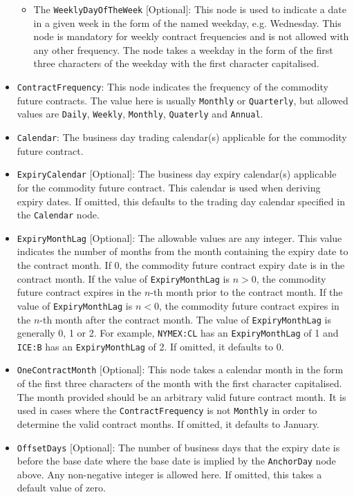 \begin{itemize}
\begin{itemize}
    \item The \lstinline!WeeklyDayOfTheWeek! [Optional]: This node is used to indicate a date in a given week in the form of the named weekday, e.g. Wednesday. This node is mandatory for weekly contract frequencies and is not allowed with any other frequency.  The node takes a weekday in the form of the first three characters of the weekday with the first character capitalised.
    \end{itemize}
\item \lstinline!ContractFrequency!: This node indicates the frequency of the commodity future contracts. The value here is usually \lstinline!Monthly! or \lstinline!Quarterly!, but allowed values are \lstinline!Daily!, \lstinline!Weekly!, \lstinline!Monthly!, \lstinline!Quaterly! and \lstinline!Annual!.
\item \lstinline!Calendar!: The business day trading calendar(s) applicable for the commodity future contract.
\item \lstinline!ExpiryCalendar! [Optional]: The business day expiry calendar(s) applicable for the commodity future contract. This calendar is used when deriving expiry dates. If omitted, this defaults to the trading day calendar specified in the \lstinline!Calendar! node.
\item \lstinline!ExpiryMonthLag! [Optional]: The allowable values are any integer. This value indicates the number of months from the month containing the expiry date to the contract month. If 0, the commodity future contract expiry date is in the contract month. If the value of \lstinline!ExpiryMonthLag! is $n > 0$, the commodity future contract expires in the $n$-th month prior to the contract month. If the value of \lstinline!ExpiryMonthLag! is $n < 0$, the commodity future contract expires in the $n$-th month after the contract month. The value of \lstinline!ExpiryMonthLag! is generally 0, 1 or 2. For example, \lstinline!NYMEX:CL! has an \lstinline!ExpiryMonthLag! of 1 and \lstinline!ICE:B! has an \lstinline!ExpiryMonthLag! of 2. If omitted, it defaults to 0.
\item \lstinline!OneContractMonth! [Optional]: This node takes a calendar month in the form of the first three characters of the month with the first character capitalised. The month provided should be an arbitrary valid future contract month. It is used in cases where the \lstinline!ContractFrequency! is not \lstinline!Monthly! in order to determine the valid contract months. If omitted, it defaults to January.
\item \lstinline!OffsetDays! [Optional]: The number of business days that the expiry date is before the base date where the base date is implied by the \lstinline!AnchorDay! node above. Any non-negative integer is allowed here. If omitted, this takes a default value of zero.

\end{itemize}
